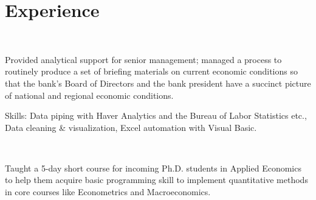 \documentclass[]{hieudo-build}
\begin{document}
\begin{minipage}[t]{0.65\textwidth} 

\section{Experience}

\\
\vspace{0.9em} %
\begin{tightemize}
\item Provided analytical support for senior management; managed a process to routinely produce a set of briefing materials on current economic conditions so that the bank’s Board of Directors and the bank president have a succinct picture of national and regional economic conditions. 
\item Skills: Data piping with Haver Analytics and the Bureau of Labor Statistics etc., Data cleaning \& visualization, Excel automation with Visual Basic.
\end{tightemize}
\sectionsep

 \\
\begin{tightemize}
\item Taught a 5-day short course for incoming Ph.D. students in Applied Economics to help them acquire basic programming skill to implement quantitative methods in core courses like Econometrics and Macroeconomics.

\end{tightemize}
\sectionsep


\end{minipage}
\end{document}
